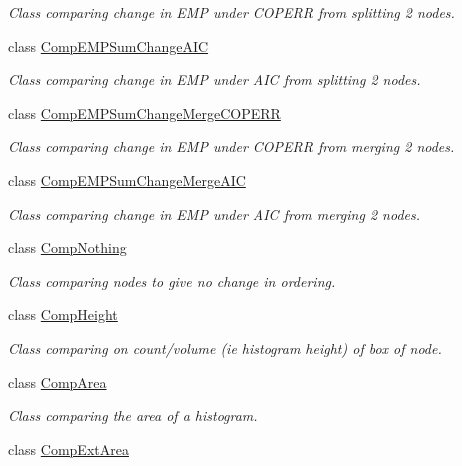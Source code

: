 \begin{DoxyCompactItemize}
\begin{DoxyCompactList}\small\item\em \-Class comparing change in \-E\-M\-P under \-C\-O\-P\-E\-R\-R from splitting 2 nodes. \end{DoxyCompactList}\item 
class \hyperlink{classsubpavings_1_1CompEMPSumChangeAIC}{\-Comp\-E\-M\-P\-Sum\-Change\-A\-I\-C}
\begin{DoxyCompactList}\small\item\em \-Class comparing change in \-E\-M\-P under \-A\-I\-C from splitting 2 nodes. \end{DoxyCompactList}\item 
class \hyperlink{classsubpavings_1_1CompEMPSumChangeMergeCOPERR}{\-Comp\-E\-M\-P\-Sum\-Change\-Merge\-C\-O\-P\-E\-R\-R}
\begin{DoxyCompactList}\small\item\em \-Class comparing change in \-E\-M\-P under \-C\-O\-P\-E\-R\-R from merging 2 nodes. \end{DoxyCompactList}\item 
class \hyperlink{classsubpavings_1_1CompEMPSumChangeMergeAIC}{\-Comp\-E\-M\-P\-Sum\-Change\-Merge\-A\-I\-C}
\begin{DoxyCompactList}\small\item\em \-Class comparing change in \-E\-M\-P under \-A\-I\-C from merging 2 nodes. \end{DoxyCompactList}\item 
class \hyperlink{classsubpavings_1_1CompNothing}{\-Comp\-Nothing}
\begin{DoxyCompactList}\small\item\em \-Class comparing nodes to give no change in ordering. \end{DoxyCompactList}\item 
class \hyperlink{classsubpavings_1_1CompHeight}{\-Comp\-Height}
\begin{DoxyCompactList}\small\item\em \-Class comparing on count/volume (ie histogram height) of box of node. \end{DoxyCompactList}\item 
class \hyperlink{classsubpavings_1_1CompArea}{\-Comp\-Area}
\begin{DoxyCompactList}\small\item\em \-Class comparing the area of a histogram. \end{DoxyCompactList}\item 
class \hyperlink{classsubpavings_1_1CompExtArea}{\-Comp\-Ext\-Area}

\end{DoxyCompactItemize}
